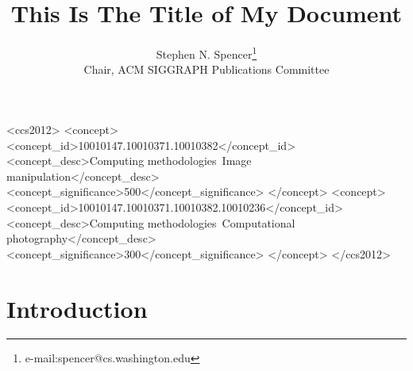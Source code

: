 \documentclass[review]{acmsiggraph}
\title{This Is The Title of My Document}
\author{Stephen N. Spencer\thanks{e-mail:spencer@cs.washington.edu}\\Chair, ACM SIGGRAPH Publications Committee}
\begin{document}


\maketitle

\begin{abstract}

\end{abstract}

%
%
\begin{CCSXML}
<ccs2012>
<concept>
<concept_id>10010147.10010371.10010382</concept_id>
<concept_desc>Computing methodologies~Image manipulation</concept_desc>
<concept_significance>500</concept_significance>
</concept>
<concept>
<concept_id>10010147.10010371.10010382.10010236</concept_id>
<concept_desc>Computing methodologies~Computational photography</concept_desc>
<concept_significance>300</concept_significance>
</concept>
</ccs2012>
\end{CCSXML}


%
%


\keywordlist

\conceptlist

\printcopyright

\section{Introduction}
\end{document}
